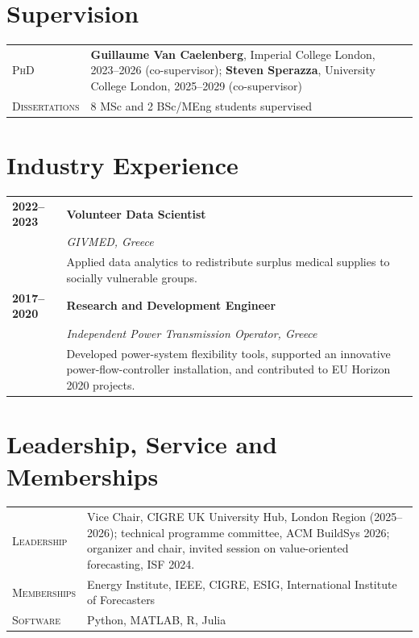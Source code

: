 \documentclass[10pt,a4paper]{article}
\makeatletter
\newlength{\datecolwidth}
\newenvironment{entrylist}{%
  \begin{longtable}{@{}p{\datecolwidth}@{\hspace{0.7em}}p{\dimexpr\linewidth-\datecolwidth-0.7em\relax}@{}}%
}{\end{longtable}}
\newcommand{\entry}[4]{%
  \textbf{#1} & \textbf{#2}\\[-0.25em]
  & {\itshape #3}\\[-0.25em]
  & #4\\[0.35em]
}
\newcommand{\entrylabel}[2]{\textsc{#1} & #2\\[0.4em]}
\makeatother
\begin{document}
\section*{Supervision}
\begin{entrylist}
  \entrylabel{PhD}{\textbf{Guillaume Van Caelenberg}, Imperial College London, 2023--2026 (co-supervisor); \textbf{Steven Sperazza}, University College London, 2025--2029 (co-supervisor)}
  \entrylabel{Dissertations}{8 MSc and 2 BSc/MEng students supervised}
\end{entrylist}

\section*{Industry Experience}
\begin{entrylist}
  \entry{2022--2023}{Volunteer Data Scientist}{GIVMED, Greece}{Applied data analytics to redistribute surplus medical supplies to socially vulnerable groups.}
  \entry{2017--2020}{Research and Development Engineer}{Independent Power Transmission Operator, Greece}{Developed power-system flexibility tools, supported an innovative power-flow-controller installation, and contributed to EU Horizon 2020 projects.}
\end{entrylist}

\section*{Leadership, Service and Memberships}
\begin{entrylist}
  \entrylabel{Leadership}{Vice Chair, CIGRE UK University Hub, London Region (2025--2026); technical programme committee, ACM BuildSys 2026; organizer and chair, invited session on value-oriented forecasting, ISF 2024.}
  \entrylabel{Memberships}{Energy Institute, IEEE, CIGRE, ESIG, International Institute of Forecasters}
  \entrylabel{Software}{Python, MATLAB, R, Julia}
\end{entrylist}
\end{document}
